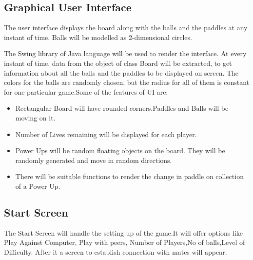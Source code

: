 \documentclass{article}
\begin{document}
    	\subsection{Graphical User Interface}
    	The user interface displays the board along with the balls and the paddles at any instant of time. Balls will be modelled as 2-dimensional circles.
    	\par\noindent The Swing library of Java language will be used to render the interface. At every instant of time, data from the object of class Board will be extracted, to get information about all the balls and the paddles to be displayed on screen. The colors for the balls are randomly chosen, but the radius for all of them is constant for one particular game.Some of the features of UI are:
    	\begin{itemize}
    	\item Rectangular Board will have rounded corners.Paddles and Balls will be moving on it.
    	\item Number of Lives remaining will be displayed for each player.
    	\item Power Ups will be random floating objects on the board. They will be randomly generated and move in random directions.
    	\item There will be suitable functions to render the change in paddle on collection of a Power Up. 
    	\end{itemize}
    	\subsection{Start Screen}
    	The Start Screen will handle the setting up of the game.It will offer options like Play Against Computer, Play with peers, Number of Players,No of balls,Level of Difficulty. After it a screen to establish connection with mates will appear.
\end{document}
